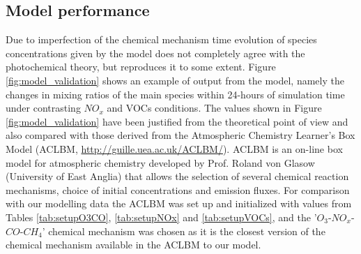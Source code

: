 \documentclass[11pt,a4paper]{article}
\begin{document}
\subsection{Model performance}
Due to imperfection of the chemical mechanism time evolution of species concentrations given by the model does not completely agree with the photochemical theory, but reproduces it to some extent. Figure \ref{fig:model_validation} shows an example of output from the model, namely the changes in mixing ratios of the main species within 24-hours of simulation time under contrasting $NO_x$ and VOCs conditions. The values shown in Figure \ref{fig:model_validation} have been justified from the theoretical point of view and also compared with those derived from the Atmospheric Chemistry Learner's Box Model (ACLBM, \href{http://guille.uea.ac.uk/ACLBM/}{http://guille.uea.ac.uk/ACLBM/}). ACLBM is an on-line box model for atmospheric chemistry developed by Prof. Roland von Glasow (University of East Anglia) that allows the selection of several chemical reaction mechanisms, choice of initial concentrations and emission fluxes. For comparison with our modelling data the ACLBM was set up and initialized with values from Tables \ref{tab:setupO3CO}, \ref{tab:setupNOx} and \ref{tab:setupVOCs}, and the '$O_3$-$NO_x$-$CO$-$CH_4$' chemical mechanism was chosen as it is the closest version of the chemical mechanism available in the ACLBM to our model.
\end{document}
